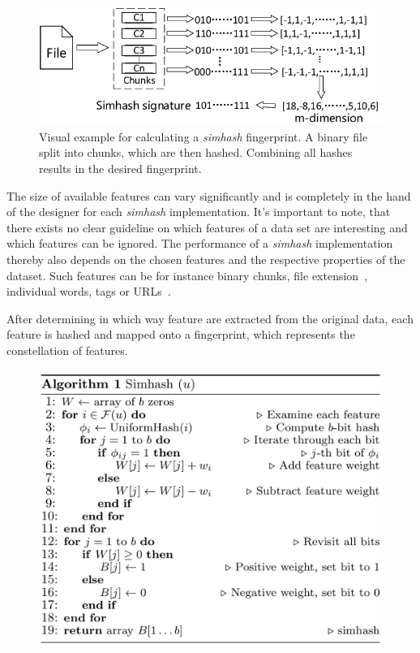 \documentclass[12pt,a4paper,DIV=calc]{scrartcl}
\begin{document}
\begin{figure}[H]
\includegraphics[scale=0.5]{./gfx/binary_chunk_fingerprint}
\centering
\caption{Visual example for calculating a \emph{simhash} fingerprint.
A binary file split into chunks, which are then hashed.
Combining all hashes results in the desired fingerprint.~\cite{article:sampling-similarity}}\label{fig:simhash-example}
\end{figure}

The size of available features can vary significantly and is completely in the hand of the designer for each \emph{simhash} implementation.
It's important to note, that there exists no clear guideline on which features of a data set are interesting and which features can be ignored.
The performance of a \emph{simhash} implementation thereby also depends on the chosen features and the respective properties of the dataset.
Such features can be for instance binary chunks, file extension~\cite{inproc:simhash}, individual words, tags or URLs~\cite{inproc:main}.

After determining in which way feature are extracted from the original data, each feature is hashed and mapped onto a fingerprint, which represents the constellation of features.

\begin{figure}[h]
\includegraphics[scale=0.4]{./gfx/pseudocode.png}
\centering
\end{figure}
\end{document}
